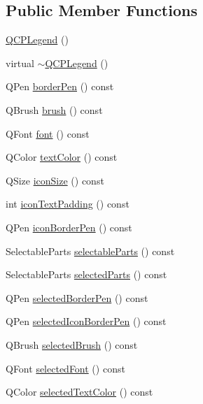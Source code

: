 \subsection*{Public Member Functions}
\begin{DoxyCompactItemize}
\item 
\hyperlink{class_q_c_p_legend_a0001a456989bd07ea378883651fabd72}{Q\+C\+P\+Legend} ()
\item 
virtual \hyperlink{class_q_c_p_legend_a52b305572e20f4e7cb37e945e2b9bec0}{$\sim$\+Q\+C\+P\+Legend} ()
\item 
Q\+Pen \hyperlink{class_q_c_p_legend_a8ffd92df86ddf43696d95f04a20e3226}{border\+Pen} () const 
\item 
Q\+Brush \hyperlink{class_q_c_p_legend_a7e5d2766e7d724f399022be8a4e8a2cb}{brush} () const 
\item 
Q\+Font \hyperlink{class_q_c_p_legend_a5cf8b840bc02f7bf4edb8dde400d0f41}{font} () const 
\item 
Q\+Color \hyperlink{class_q_c_p_legend_ad60a058af7491f6b140c104c6a0f9458}{text\+Color} () const 
\item 
Q\+Size \hyperlink{class_q_c_p_legend_a27dfb770b14adc0e8811bef8129780a5}{icon\+Size} () const 
\item 
int \hyperlink{class_q_c_p_legend_a9d6d07042a284c4ba5f9e3cb5c9281ef}{icon\+Text\+Padding} () const 
\item 
Q\+Pen \hyperlink{class_q_c_p_legend_a2c4719d79630b0d0c75ef2333c59a912}{icon\+Border\+Pen} () const 
\item 
Selectable\+Parts \hyperlink{class_q_c_p_legend_aa90c7fdbad7a0e93527bafb1f1f49a43}{selectable\+Parts} () const 
\item 
Selectable\+Parts \hyperlink{class_q_c_p_legend_abbbf1b2d6a149013527ed87b0780894a}{selected\+Parts} () const 
\item 
Q\+Pen \hyperlink{class_q_c_p_legend_a63156bc4ce64431bada7415cfa2b4dd1}{selected\+Border\+Pen} () const 
\item 
Q\+Pen \hyperlink{class_q_c_p_legend_a165630cad7e41f89b54f65cdef3310e8}{selected\+Icon\+Border\+Pen} () const 
\item 
Q\+Brush \hyperlink{class_q_c_p_legend_a600dde0d207ddc6f5a603767360cceac}{selected\+Brush} () const 
\item 
Q\+Font \hyperlink{class_q_c_p_legend_a4c1b08fc0afacb4ffd54f6a49737fa77}{selected\+Font} () const 
\item 
Q\+Color \hyperlink{class_q_c_p_legend_a08005f3c17728c2c4e23b8ffc0842ffb}{selected\+Text\+Color} () const 

\end{DoxyCompactItemize}
